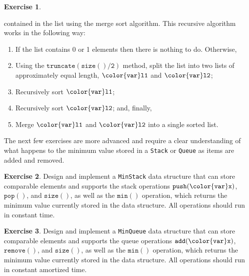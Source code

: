 \documentclass[10pt]{book}
\theoremstyle{plain}
\theoremstyle{definition}
\newtheorem{exc}{Exercise}[chapter]
\begin{document}
\begin{exc}
\begin{enumerate}
       contained in the list using the merge sort algorithm.
       This recursive algorithm works in the following way:
       \begin{enumerate}
          \item If the list contains 0 or 1 elements then there is
            nothing to do.  Otherwise,
          \item Using the \ensuremath{\mathtt{truncate(size()/2)}} method, split the list
            into two lists of approximately equal length, \ensuremath{\mathtt{{\color{var}l1}}} and \ensuremath{\mathtt{{\color{var}l2}}};
          \item Recursively sort \ensuremath{\mathtt{{\color{var}l1}}};
          \item Recursively sort \ensuremath{\mathtt{{\color{var}l2}}}; and, finally,
          \item Merge \ensuremath{\mathtt{{\color{var}l1}}} and \ensuremath{\mathtt{{\color{var}l2}}} into a single sorted list.
       \end{enumerate}
  \end{enumerate}
\end{exc}


The next few exercises are more advanced and require a clear
understanding of what happens to the minimum value stored in a \texttt{Stack}
or \texttt{Queue} as items are added and removed.

\begin{exc}
  Design and implement a \texttt{MinStack} data structure that can store
  comparable elements and supports the stack operations \ensuremath{\mathtt{push({\color{var}x})}},
  \ensuremath{\mathtt{pop()}}, and \ensuremath{\mathtt{size()}}, as well as the \ensuremath{\mathtt{min()}} operation, which
  returns the minimum value currently stored in the data structure.
  All operations should run in constant time.
\end{exc}

\begin{exc}
  Design and implement a \texttt{MinQueue} data structure that can store
  comparable elements and supports the queue operations \ensuremath{\mathtt{add({\color{var}x})}},
  \ensuremath{\mathtt{remove()}}, and \ensuremath{\mathtt{size()}}, as well as the \ensuremath{\mathtt{min()}} operation, which
  returns the minimum value currently stored in the data structure.
  All operations should run in constant amortized time.
\end{exc}
\end{document}
